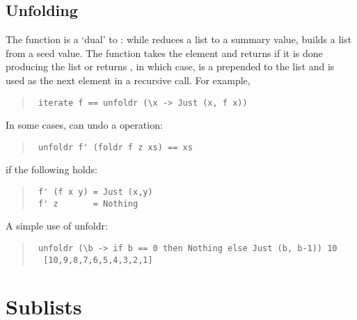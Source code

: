 \subsection{Unfolding
}
\begin{haddockdesc}
\item[\begin{tabular}{@{}l}
unfoldr\ ::\ (b\ ->\ Maybe\ (a,\ b))\ ->\ b\ ->\ {\char 91}a{\char 93}
\end{tabular}]\haddockbegindoc
The  function is a `dual' to : while 
 reduces a list to a summary value,  builds a list from
 a seed value.  The function takes the element and returns 
 if it is done producing the list or returns  , in which
 case,  is a prepended to the list and  is used as the next
 element in a recursive call.  For example,
\par
\begin{quote}
{\haddockverb\begin{verbatim}
 iterate f == unfoldr (\x -> Just (x, f x))
\end{verbatim}}
\end{quote}
In some cases,  can undo a  operation:
\par
\begin{quote}
{\haddockverb\begin{verbatim}
 unfoldr f' (foldr f z xs) == xs
\end{verbatim}}
\end{quote}
if the following holds:
\par
\begin{quote}
{\haddockverb\begin{verbatim}
 f' (f x y) = Just (x,y)
 f' z       = Nothing
\end{verbatim}}
\end{quote}
A simple use of unfoldr:
\par
\begin{quote}
{\haddockverb\begin{verbatim}
 unfoldr (\b -> if b == 0 then Nothing else Just (b, b-1)) 10
  [10,9,8,7,6,5,4,3,2,1]
\end{verbatim}}
\end{quote}

\end{haddockdesc}
\section{Sublists
}
